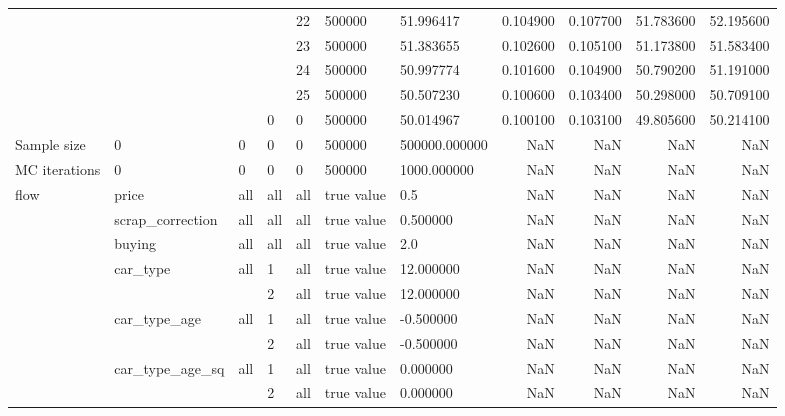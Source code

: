 \begin{tabular}{lllllllrrrr}
\cline{5-11}
 &  &  &  & 22 & 500000 & 51.996417 & 0.104900 & 0.107700 & 51.783600 & 52.195600 \\
\cline{5-11}
 &  &  &  & 23 & 500000 & 51.383655 & 0.102600 & 0.105100 & 51.173800 & 51.583400 \\
\cline{5-11}
 &  &  &  & 24 & 500000 & 50.997774 & 0.101600 & 0.104900 & 50.790200 & 51.191000 \\
\cline{5-11}
 &  &  &  & 25 & 500000 & 50.507230 & 0.100600 & 0.103400 & 50.298000 & 50.709100 \\
\cline{4-11} \cline{5-11}
 &  &  & 0 & 0 & 500000 & 50.014967 & 0.100100 & 0.103100 & 49.805600 & 50.214100 \\
\cline{1-11} \cline{2-11} \cline{3-11} \cline{4-11} \cline{5-11}
Sample size & 0 & 0 & 0 & 0 & 500000 & 500000.000000 & NaN & NaN & NaN & NaN \\
\cline{1-11} \cline{2-11} \cline{3-11} \cline{4-11} \cline{5-11}
MC iterations & 0 & 0 & 0 & 0 & 500000 & 1000.000000 & NaN & NaN & NaN & NaN \\
\cline{1-11} \cline{2-11} \cline{3-11} \cline{4-11} \cline{5-11}
\multirow[t]{11}{*}{flow} & price & all & all & all & true value & 0.5 & NaN & NaN & NaN & NaN \\
\cline{2-11} \cline{3-11} \cline{4-11} \cline{5-11}
 & scrap_correction & all & all & all & true value & 0.500000 & NaN & NaN & NaN & NaN \\
\cline{2-11} \cline{3-11} \cline{4-11} \cline{5-11}
 & buying & all & all & all & true value & 2.0 & NaN & NaN & NaN & NaN \\
\cline{2-11} \cline{3-11} \cline{4-11} \cline{5-11}
 & \multirow[t]{2}{*}{car_type} & \multirow[t]{2}{*}{all} & 1 & all & true value & 12.000000 & NaN & NaN & NaN & NaN \\
\cline{4-11} \cline{5-11}
 &  &  & 2 & all & true value & 12.000000 & NaN & NaN & NaN & NaN \\
\cline{2-11} \cline{3-11} \cline{4-11} \cline{5-11}
 & \multirow[t]{2}{*}{car_type_age} & \multirow[t]{2}{*}{all} & 1 & all & true value & -0.500000 & NaN & NaN & NaN & NaN \\
\cline{4-11} \cline{5-11}
 &  &  & 2 & all & true value & -0.500000 & NaN & NaN & NaN & NaN \\
\cline{2-11} \cline{3-11} \cline{4-11} \cline{5-11}
 & \multirow[t]{2}{*}{car_type_age_sq} & \multirow[t]{2}{*}{all} & 1 & all & true value & 0.000000 & NaN & NaN & NaN & NaN \\
\cline{4-11} \cline{5-11}
 &  &  & 2 & all & true value & 0.000000 & NaN & NaN & NaN & NaN \\

\end{tabular}
